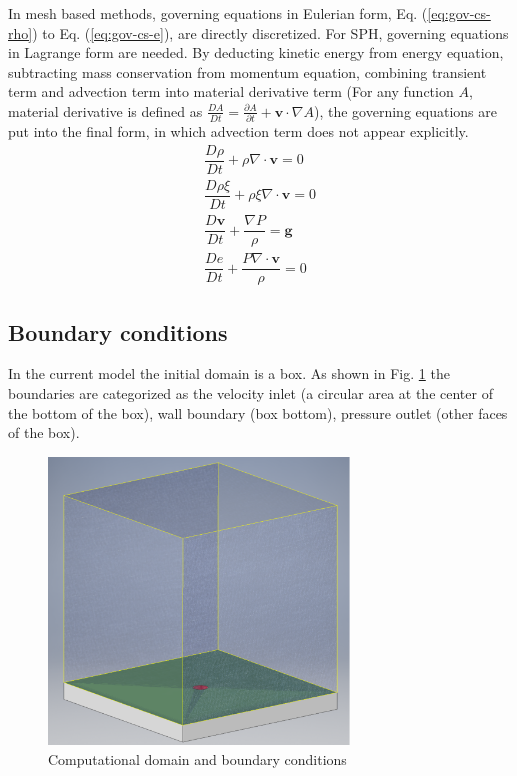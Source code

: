 In mesh based methods, governing equations in Eulerian form, Eq. (\ref{eq:gov-cs-rho}) to Eq. (\ref{eq:gov-cs-e}), are directly discretized. For SPH, governing equations in Lagrange form are needed. By deducting kinetic energy from energy equation, subtracting mass conservation from momentum equation, combining transient term and advection term into material derivative term (For any function $A$, material derivative is defined as $\frac{D A}{Dt} = \frac{\partial A}{\partial t} + \textbf{v} \cdot \nabla A$), the governing equations are put into the final form, in which advection term does not appear explicitly.
\begin{align}
\dfrac{D \rho}{D t} + \rho \nabla \cdot \textbf{v} = 0 \label{eq:gov-nc-rho}\\
\dfrac{D \rho \xi}{D t} + \rho \xi \nabla \cdot \textbf{v} = 0 \label{eq:gov-nc-ks}\\
\dfrac{D \textbf{v}}{D t} + \dfrac{\nabla P}{\rho} =\textbf{g} \label{eq:gov-nc-v}\\
\dfrac{D e}{D t} + \dfrac{P \nabla \cdot \textbf{v}}{\rho} = 0 \label{eq:gov-nc-e}
\end{align}

\subsection{Boundary conditions}
In the current model the initial domain is a box. As shown in Fig. \ref{fig:domain-BCs} the boundaries are categorized as the velocity inlet (a circular area at the center of the bottom of the box), wall boundary (box bottom), pressure outlet (other faces of the box).
\begin{figure}
\center
\includegraphics[width=8cm]{Chapter-2/Figures/Domain_good}
\caption{Computational domain and boundary conditions}
\label{fig:domain-BCs}
\end{figure}


